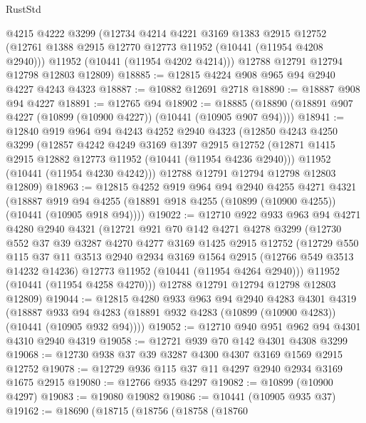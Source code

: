 \begin{lexlean}{RustStd}
\begin{coremodule}
      @4215
      @4222
      @3299
      (@12734
        @4214
        @4221
        @3169
        @1383
        @2915
        @12752
        (@12761 @1388 @2915 @12770 @12773 @11952 (@10441 (@11954 @4208 @2940)))
        @11952
        (@10441 (@11954 @4202 @4214)))
      @12788
      @12791
      @12794
      @12798
      @12803
      @12809)
@18885 := @12815 @4224 @908 @965 @94 @2940 @4227 @4243 @4323
@18887 := @10882 @12691 @2718
@18890 := @18887 @908 @94 @4227
@18891 := @12765 @94
@18902 := @18885 (@18890 (@18891 @907 @4227 (@10899 (@10900 @4227)) (@10441 (@10905 @907 @94))))
@18941 := @12840
    @919
    @964
    @94
    @4243
    @4252
    @2940
    @4323
    (@12850
      @4243
      @4250
      @3299
      (@12857
        @4242
        @4249
        @3169
        @1397
        @2915
        @12752
        (@12871 @1415 @2915 @12882 @12773 @11952 (@10441 (@11954 @4236 @2940)))
        @11952
        (@10441 (@11954 @4230 @4242)))
      @12788
      @12791
      @12794
      @12798
      @12803
      @12809)
@18963 := @12815
    @4252
    @919
    @964
    @94
    @2940
    @4255
    @4271
    @4321
    (@18887 @919 @94 @4255 (@18891 @918 @4255 (@10899 (@10900 @4255)) (@10441 (@10905 @918 @94))))
@19022 := @12710
    @922
    @933
    @963
    @94
    @4271
    @4280
    @2940
    @4321
    (@12721
      @921
      @70
      @142
      @4271
      @4278
      @3299
      (@12730
        @552
        @37
        @39
        @3287
        @4270
        @4277
        @3169
        @1425
        @2915
        @12752
        (@12729
          @550
          @115
          @37
          @11
          @3513
          @2940
          @2934
          @3169
          @1564
          @2915
          (@12766 @549 @3513 @14232 @14236)
          @12773
          @11952
          (@10441 (@11954 @4264 @2940)))
        @11952
        (@10441 (@11954 @4258 @4270)))
      @12788
      @12791
      @12794
      @12798
      @12803
      @12809)
@19044 := @12815
    @4280
    @933
    @963
    @94
    @2940
    @4283
    @4301
    @4319
    (@18887 @933 @94 @4283 (@18891 @932 @4283 (@10899 (@10900 @4283)) (@10441 (@10905 @932 @94))))
@19052 := @12710 @940 @951 @962 @94 @4301 @4310 @2940 @4319
@19058 := @12721 @939 @70 @142 @4301 @4308 @3299
@19068 := @12730 @938 @37 @39 @3287 @4300 @4307 @3169 @1569 @2915 @12752
@19078 := @12729 @936 @115 @37 @11 @4297 @2940 @2934 @3169 @1675 @2915
@19080 := @12766 @935 @4297
@19082 := @10899 (@10900 @4297)
@19083 := @19080 @19082
@19086 := @10441 (@10905 @935 @37)
@19162 := @18690
    (@18715
      (@18756
        (@18758
          (@18760

\end{coremodule}
\end{lexlean}
